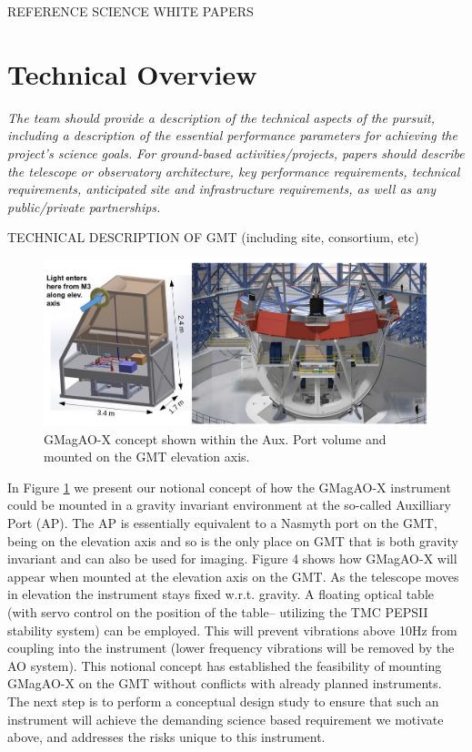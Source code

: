 \documentclass[12pt,preprint]{aastex}
\begin{document}
REFERENCE SCIENCE WHITE PAPERS

\section{Technical Overview}
\textit{The team should provide a description of the technical aspects of the
pursuit, including a description of the essential performance parameters for achieving the
project's science goals.}
\textit{For ground-based activities/projects, papers should describe the telescope or
observatory architecture, key performance requirements, technical requirements,
anticipated site and infrastructure requirements, as well as any public/private
partnerships.}

TECHNICAL DESCRIPTION OF GMT (including site, consortium, etc)

\begin{figure}[h!]
\centering
\includegraphics[width=6in]{figures/ap.png}
\caption{ GMagAO-X concept shown within the Aux. Port volume and mounted on the GMT elevation axis. \label{fig:ap}}
\end{figure}

In Figure \ref{fig:ap} we present our notional concept of how the GMagAO-X instrument could be mounted in a gravity invariant environment at the so-called Auxilliary Port (AP). The AP is essentially equivalent to a Nasmyth port on the GMT, being on the elevation axis and so is the only place on GMT that is both gravity invariant and can also be used for imaging.  Figure 4 shows how GMagAO-X will appear when mounted at the elevation axis on the GMT. As the telescope moves in elevation the instrument stays fixed w.r.t. gravity. A floating optical table (with servo control on the position of the table-- utilizing the TMC PEPSII stability system) can be employed.  This will prevent vibrations above 10Hz from coupling into the instrument (lower frequency vibrations will be removed by the AO system). 
This notional concept has established the feasibility of mounting GMagAO-X on the GMT without conflicts with already planned instruments.  The next step is to perform a conceptual design study to ensure that such an instrument will achieve the demanding science based requirement we motivate above, and addresses the risks unique to this instrument. 
\end{document}
